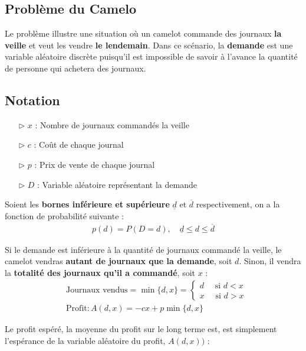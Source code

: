 \documentclass{report}
\begin{document}
\begin{multicols*}{2}
    \chapter{Problème du Camelo}
    Le problème illustre une situation où un camelot commande des journaux 
    \textbf{la veille} et veut les vendre \textbf{le lendemain}. Dans ce scénario, 
    la \textbf{demande} est une variable aléatoire discrète 
    puisqu'il est impossible 
    de savoir à l'avance la quantité de personne qui achetera 
    des journaux. 

    \section{Notation}
    \begin{itemize}
        \item [$\rhd$ ] \( x \) : Nombre de journaux commandés la veille 
        \item [$\rhd$ ] \( c \) : Coût de chaque journal
        \item [$\rhd$ ] \( p \) : Prix de vente de chaque journal
        \item [$\rhd$ ] \( D \) : Variable aléatoire représentant la demande
    \end{itemize}
    Soient les \textbf{bornes inférieure et supérieure} 
    \( \underline{d} \) et \( \overline{d} \) respectivement, 
    on a la fonction de probabilité suivante : 
    \begin{align*}
        p(d) = P(D = d), \quad \underline{d} \leq d \leq \overline{d}
    \end{align*}

    Si le demande est inférieure à la quantité de journaux commandé la veille, 
    le camelot vendras \textbf{autant de journaux que la demande}, soit \( d \).
    Sinon, il vendra la \textbf{totalité des journaux qu'il a commandé}, soit \( x \) : 
    \begin{align*}
        &\text{Journaux vendus} 
        = 
        \min\{d, x\}
        = 
        \begin{cases}
            d \quad \text{ si } d < x
            \\
            x \quad \text{ si } d > x
        \end{cases}
        \\
        &\text{Profit} : A(d, x) = -cx + p \min\{ d, x\}
    \end{align*}        

    Le profit espéré, la moyenne du profit sur le long terme est, est 
    simplement l'espérance de la variable aléatoire du profit, \( A(d,x)) \) :


\end{multicols*}
\end{document}
